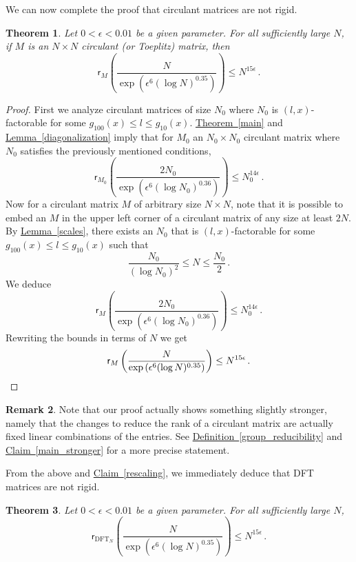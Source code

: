 \documentclass[11pt]{article}
\numberwithin{equation}{section}
\newtheorem{theorem}{Theorem}[section]
\theoremstyle{definition}
\newtheorem{remark}[theorem]{Remark}
\theoremstyle{plain}
\newcommand{\expref}[2]{\hyperref[#2]{#1~\ref{#2}}}
\theoremstyle{definition}
\DeclareMathOperator{\DFT}{DFT}
\begin{document}
We can now complete the proof that %
%
 circulant matrices are not rigid. 
\begin{theorem}\label{main_circulant}
Let $0 < \epsilon < 0.01$ be a given parameter.  For all sufficiently 
large $N$, if $M$ is an $N \times N$ %
circulant (or Toeplitz) %
matrix, then %
\[
\textsf{r}_{M}\left(\frac{N}{\exp\left(\epsilon^6(\log N)^{0.35}\right)}\right) \leq N^{15 \epsilon} \,.
\]
\end{theorem}
\begin{proof}
First we analyze circulant matrices of size $N_0$ where $N_0$ is $(l,x)$-factorable for some $g_{100}(x) \leq l \leq g_{10}(x)$.  \expref{Theorem}{main} and \expref{Lemma}{diagonalization} imply that for $M_0$ an $N_0 \times N_0$ circulant matrix where $N_0$ satisfies the previously mentioned 
%
conditions, %
\[
\textsf{r}_{M_0}\left(\frac{2N_0}{\exp\left(\epsilon^6(\log N_0)^{0.36}\right)}\right) \leq N_0^{14 \epsilon} \,.
\]
Now for a circulant matrix $M$ of arbitrary size $N \times N$, note that it is possible to embed an $M$ in the upper left corner of a circulant matrix of any size at least $2N$.  By \expref{Lemma}{scales}, there exists an $N_0$ that is $(l,x)$-factorable for some $g_{100}(x) \leq l \leq g_{10}(x)$ such that
\[
\frac{N_0}{(\log N_0)^2} \leq N \leq \frac{N_0}{2} \,.
\]
We deduce
\[
\textsf{r}_{M}\left(\frac{2N_0}{\exp\left(\epsilon^6(\log N_0)^{0.36}\right)}\right) \leq N_0^{14 \epsilon} \,.
\]
Rewriting the bounds in terms of $N$ we get
\[
\textsf{r}_{M}\left(\frac{N}{\exp\left(\epsilon^6(\log N)^{0.35}\right)}\right) \leq N^{15 \epsilon} \,. \qedhere
\]
\end{proof}
\begin{remark}
Note that our proof actually shows something slightly stronger, namely that the changes to reduce the rank of a circulant matrix are actually fixed linear combinations of the entries.  See \expref{Definition}{group_reducibility} and \expref{Claim}{main_stronger} for a more precise statement.
\end{remark}
{}From the above and \expref{Claim}{rescaling}, we immediately deduce that %
DFT %
 matrices are not rigid.
\begin{theorem}\label{full_fourier}
Let $0 < \epsilon < 0.01$ be a given parameter.  For all sufficiently large $N$,
%
%
%
 \[
\textsf{r}_{\DFT_N}\left(\frac{N}{\exp\left(\epsilon^6(\log N)^{0.35}\right)}\right) \leq N^{15 \epsilon} \,.
\]
\end{theorem}

%
\end{document}
